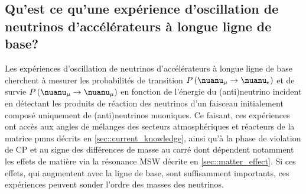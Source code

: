 
    \subsection{Qu'est ce qu'une expérience d'oscillation de neutrinos d'accélérateurs à longue ligne de base?}

      Les expériences d'oscillation de neutrinos d'accélérateurs à longue ligne de base cherchent à mesurer les probabilités de transition $P\left(\nuanu_{\mu}\to \nuanu_e\right)$ et de survie $P\left(\nuanu_{\mu}\to \nuanu_{\mu}\right)$ en fonction de l'énergie du (anti)neutrino incident en détectant les produits de réaction des neutrinos d'un faisceau initialement composé uniquement de (anti)neutrinos muoniques. Ce faisant, ces expériences ont accès aux angles de mélanges des secteurs atmosphériques et réacteurs de la matrice \gls{pmns} décrits en \autoref{sec::current_knowledge}, ainsi qu'à la phase de violation de CP et au signe des différences de masse au carré dont dépendent notamment les effets de matière via la résonance MSW décrite en \autoref{sec::matter_effect}. Si ces effets, qui augmentent avec la ligne de base, sont suffisamment importants, ces expériences peuvent sonder l'ordre des masses des neutrinos.
    
